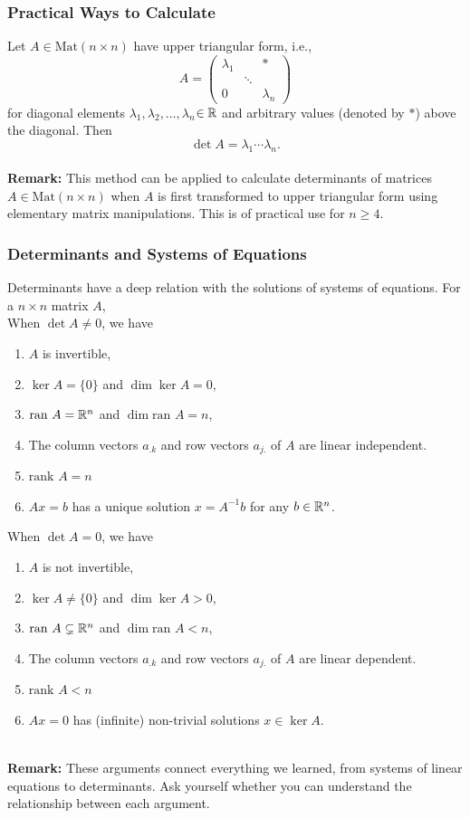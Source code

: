 \documentclass[12pt, t]{beamer}
\newcommand{\myseries}[2]{$#1_1,#1_2,\dots,#1_#2$}
\newcommand{\nullspace}{~\\[15pt]}
\newcommand{\remark}{\textbf{Remark: }}
\begin{document}
\begin{frame}
    \frametitle{Practical Ways to Calculate}
    Let $A\in\text{Mat}(n\times n)$ have upper triangular form, i.e.,
    \[A=\begin{pmatrix}
            \lambda_1 &        & *         \\
                      & \ddots &           \\
            0         &        & \lambda_n
        \end{pmatrix}\]
    for diagonal elements \myseries{\lambda}{n}$\in\mathbb{R}$ and arbitrary values (denoted by $*$) above the diagonal. Then
    \[\det A=\lambda_1\cdots\lambda_n.\]
        \\[9pt]
        \remark
    This method can be applied to calculate determinants of matrices $A\in\text{Mat}(n\times n)$ when $A$ is first transformed to upper triangular form using elementary matrix manipulations. This is of practical use for $n\geq 4$.


\end{frame}

\begin{frame}
    \frametitle{Determinants and Systems of Equations}
    Determinants have a deep relation with the solutions of systems of equations. For a $n\times n$ matrix $A$, \\[9pt]

    When $\det A \neq 0$, we have

    \begin{enumerate}
        \item $A$ is invertible,
        \item $\ker A = \{0\}$ and $\dim \ker A = 0$,
        \item $\text{ran }A=\mathbb{R}^n$ and $\dim \text{ran }A=n$,
        \item The column vectors $a_{.k}$ and row vectors $a_{j.}$ of $A$ are linear independent.
        \item $\text{rank }A=n$
        \item $Ax=b$ has a unique solution $x=A^{-1}b$ for any $b\in\mathbb{R}^n$.
    \end{enumerate}

    \newpage
    When $\det A = 0$, we have

    \begin{enumerate}
        \item $A$ is not invertible,
        \item $\ker A \neq \{0\}$ and $\dim \ker A > 0$,
        \item $\text{ran }A \subsetneq  \mathbb{R}^n$ and $\dim \text{ran }A<n$,
        \item The column vectors $a_{.k}$ and row vectors $a_{j.}$ of $A$ are linear dependent.
        \item $\text{rank }A<n$
        \item $Ax=0$ has (infinite) non-trivial solutions $x\in \ker A$.
    \end{enumerate}
    \nullspace
    \remark
    These arguments connect everything we learned, from systems of linear equations to determinants. Ask yourself whether you can understand the relationship between each argument.
\end{frame}
\end{document}
